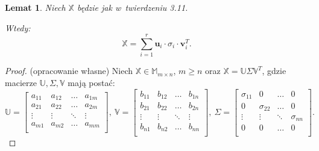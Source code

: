 \documentclass[12pt,a4paper]{report}
\newtheorem{lemat}[df]{Lemat}
\begin{document}
\begin{lemat}
Niech $\mathbb{X}$ będzie jak w~twierdzeniu 3.11.

Wtedy:
$$
\mathbb{X} = \sum_{i=1}^r \mathbf{u}_i \cdot\sigma_i \cdot \mathbf{v}_i^T.
$$
\end{lemat}
\begin{proof}(opracowanie własne)
Niech $\mathbb{X} \in \mathbb{M}_{m \times n}$, $m \geq n$ oraz $\mathbb{X}=\mathbb{U} \Sigma \mathbb{V}^T$, gdzie macierze $\mathbb{U}, \Sigma, \mathbb{V}$ mają postać:
$$
\mathbb{U} = \left[
        \begin{array}{cccc}
         a_{11} & a_{12} & \ldots & a_{1m} \\
         a_{21} & a_{22} & \ldots & a_{2m} \\
         \vdots & \vdots & \ddots & \vdots \\
         a_{m1} & a_{m2} & \ldots & a_{mm} \\
         \end{array}
      \right], \: \mathbb{V} = \left[
        \begin{array}{cccc}
         b_{11} & b_{12} & \ldots & b_{1n}  \\
         b_{21} & b_{22} & \ldots & b_{2n} \\
         \vdots & \vdots & \ddots & \vdots \\
         b_{n1} & b_{n2} & \ldots & b_{nn} \\
         \end{array}
      \right], \: \Sigma = \left[
        \begin{array}{cccc}
         \sigma_{11} & 0 & \ldots & 0 \\
         0 & \sigma_{22} & \ldots & 0 \\
         \vdots & \vdots & \ddots & \sigma_{nn} \\
         0 & 0 & \ldots & 0 \\
         \end{array}
      \right].$$
      

\end{proof}
\end{document}
